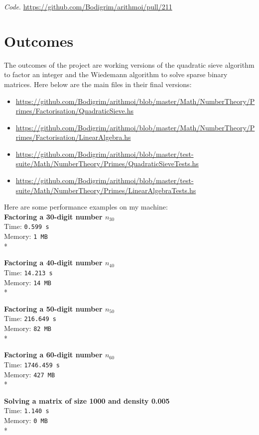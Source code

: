 \documentclass{amsart}
\theoremstyle{definition}
\theoremstyle{remark}
\numberwithin{equation}{section}
\begin{document}
\emph{Code}. \url{https://github.com/Bodigrim/arithmoi/pull/211}

\section{Outcomes}
\label{sec:outcomes}

The outcomes of the project are working versions of the quadratic sieve algorithm to factor an integer and the Wiedemann algorithm to solve sparse binary matrices. Here below are the main files in their final versions:

\begin{itemize}
\item \url{https://github.com/Bodigrim/arithmoi/blob/master/Math/NumberTheory/Primes/Factorisation/QuadraticSieve.hs}
\item \url{https://github.com/Bodigrim/arithmoi/blob/master/Math/NumberTheory/Primes/Factorisation/LinearAlgebra.hs}
\item \url{https://github.com/Bodigrim/arithmoi/blob/master/test-suite/Math/NumberTheory/Primes/QuadraticSieveTests.hs}
\item \url{https://github.com/Bodigrim/arithmoi/blob/master/test-suite/Math/NumberTheory/Primes/LinearAlgebraTests.hs}
\end{itemize}

Here are some performance examples on my machine:\\

\textbf{Factoring a 30-digit number $n_{30}$}\\
Time: \texttt{0.599 s} \\
Memory: \texttt{1 MB} \\*

\textbf{Factoring a 40-digit number $n_{40}$}\\
Time: \texttt{14.213 s} \\
Memory: \texttt{14 MB} \\*

\textbf{Factoring a 50-digit number $n_{50}$}\\
Time: \texttt{216.649 s} \\
Memory: \texttt{82 MB} \\*

\textbf{Factoring a 60-digit number $n_{60}$}\\
Time: \texttt{1746.459 s} \\
Memory: \texttt{427 MB} \\*

\textbf{Solving a matrix of size 1000 and density 0.005}\\
Time: \texttt{1.140 s} \\
Memory: \texttt{0 MB} \\*
\end{document}
